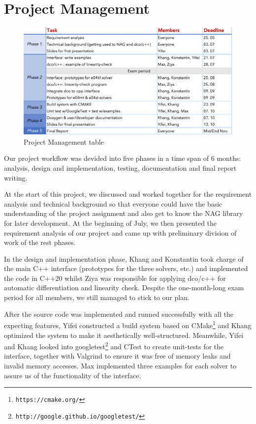 \documentclass{book}
\begin{document}
\chapter{Project Management} \label{ch:projectmanagement}
\begin{figure}
\includegraphics[width=\textwidth]{proj_management.png}
\caption{\small Project Management table}
\end{figure}\par
\hspace{4ex}Our project workflow was devided into five phases in a time span of 6 months: analysis, design and implementation, testing, documentation and final report writing. \par
\vspace{1em}
At the start of this project, we discussed and worked together for the requirement analysis and technical background so that everyone could have the basic understanding of the project assignment and also get to know the NAG library for later development. At the beginning of July, we then presented the requirement analysis of our project and came up with  preliminary division of work of the rest phases. \par
In the design and implementation phase, Khang and Konstantin took charge of the main C++ interface (prototypes for the three solvers, etc.) and implemented the code in C++20 whilst Ziya was responsible for applying dco/c++ for automatic differentiation and linearity check. Despite the one-month-long exam period for all members, we still managed to stick to our plan. \par
After the source code was implemented and runned successfully with all the expecting features, Yifei constructed a build system based on CMake\footnote{\tt https://cmake.org/} and Khang optimized the system to make it aesthetically well-structured. Meanwhile, Yifei and Khang looked into googletest\footnote{\tt http://google.github.io/googletest/} and CTest to create unit-tests for the interface, together with Valgrind to ensure it was free of memory leaks and invalid memory accesses. Max implemented three examples for each solver to assure us of the functionality of the interface. \par
\end{document}
